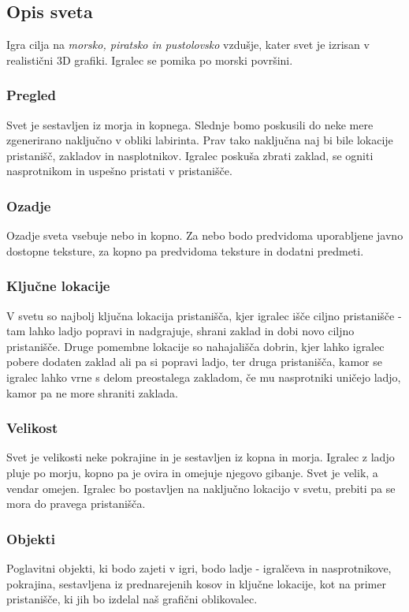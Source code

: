 \documentclass[a4paper]{article}
\begin{document}
\subsection{Opis sveta}
Igra cilja na \textit{morsko, piratsko in pustolovsko} vzdušje, kater svet je izrisan v realistični 3D grafiki. Igralec se pomika po morski površini.

\subsubsection{Pregled}
Svet je sestavljen iz morja in kopnega. Slednje bomo poskusili do neke mere zgenerirano naključno v obliki labirinta. Prav tako naključna naj bi bile lokacije pristanišč, zakladov in nasplotnikov. Igralec poskuša zbrati zaklad, se ogniti nasprotnikom in uspešno pristati v pristanišče.

\subsubsection{Ozadje}
Ozadje sveta vsebuje nebo in kopno. Za nebo bodo predvidoma uporabljene javno dostopne teksture, za kopno pa predvidoma teksture in dodatni predmeti.

\subsubsection{Ključne lokacije}
V svetu so najbolj ključna lokacija pristanišča, kjer igralec išče ciljno pristanišče - tam lahko ladjo popravi in nadgrajuje, shrani zaklad in dobi novo ciljno pristanišče. Druge pomembne lokacije so nahajališča dobrin, kjer lahko igralec pobere dodaten zaklad ali pa si popravi ladjo, ter druga pristanišča, kamor se igralec lahko vrne s delom preostalega zakladom, če mu nasprotniki uničejo ladjo, kamor pa ne more shraniti zaklada.

\subsubsection{Velikost}
Svet je velikosti neke pokrajine in je sestavljen iz kopna in morja. Igralec z ladjo pluje po morju, kopno pa je ovira in omejuje njegovo gibanje. Svet je velik, a vendar omejen. Igralec bo postavljen na naključno lokacijo v svetu, prebiti pa se mora do pravega pristanišča. 

\subsubsection{Objekti}
Poglavitni objekti, ki bodo zajeti v igri, bodo ladje - igralčeva in nasprotnikove, pokrajina, sestavljena iz prednarejenih kosov in ključne lokacije, kot na primer pristanišče, ki jih bo izdelal naš grafični oblikovalec.
\end{document}
